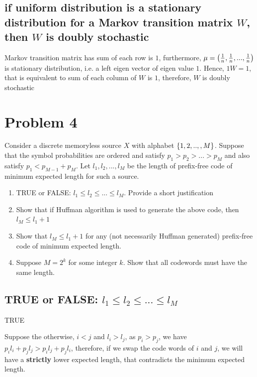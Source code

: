 \documentclass{article}
\begin{document}
\subsection{if uniform distribution is a stationary distribution for a Markov transition matrix $W$, then $W$ is doubly stochastic}

Markov transition matrix has sum of each row is $1$, furthermore, $\mu = \tuple*{\frac{1}{n}, \frac{1}{n}, ..., \frac{1}{n}}$ is stationary distribution, i.e. a left eigen vector of eigen value $1$. Hence, $1 W = 1$, that is equivalent to sum of each column of $W$ is $1$, therefore, $W$ is doubly stochastic

\section{Problem 4}
Consider a discrete memoryless source $X$ with alphabet $\set{1, 2, ..,, M}$. Suppose that the symbol probabilities are ordered and satisfy $p_1 > p_2 > ... > p_M$ and also satisfy $p_1 < p_{M-1} + p_M$. Let $l_1, l_2, ..., l_M$ be the length of prefix-free code of minimum expected length for such a source.
\begin{enumerate}
\item TRUE or FALSE: $l_1 \leq l_2 \leq ... \leq l_M$. Provide a short justification

\item Show that if Huffman algorithm is used to generate the above code, then $l_M \leq l_1 + 1$

\item Show that $l_M \leq l_1 + 1$ for any (not necessarily Huffman generated) prefix-free code of minimum expected length.

\item Suppose $M = 2^k$ for some integer $k$. Show that all codewords must have the same length.
\end{enumerate}

\subsection{TRUE or FALSE: $l_1 \leq l_2 \leq ... \leq l_M$}

TRUE

Suppose the otherwise, $i < j$ and $l_i > l_j$, as $p_i > p_j$, we have $p_i l_i + p_j l_j > p_i l_j + p_j l_i$, therefore, if we swap the code words of $i$ and $j$, we will have a \textbf{strictly} lower expected length, that contradicts the minimum expected length.
\end{document}
